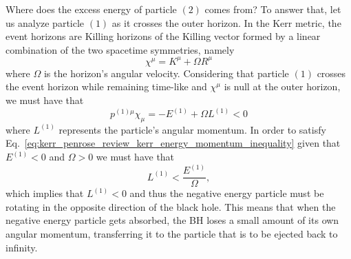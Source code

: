 Where does the excess energy of particle $(2)$ comes from? To answer that, let us analyze particle $(1)$ as it crosses the outer horizon. In the Kerr metric, the event horizons are Killing horizons of the Killing vector formed by a linear combination of the two spacetime symmetries, namely
%
\begin{equation}
  \chi^\mu = K^\mu + \Omega R^\mu
  \label{eq:kerr_penrose_review_kerr_killing_horizon}
\end{equation}
%
where $\Omega$ is the horizon's angular velocity. Considering that particle $(1)$ crosses the event horizon while remaining time-like and $\chi^\mu$ is null at the outer horizon, we must have that
%
\begin{equation}
  p^{(1)\mu}\chi_\mu = -E^{(1)} + \Omega L^{(1)} < 0
  \label{eq:kerr_penrose_review_kerr_energy_momentum_inequality}
\end{equation}
%
where $L^{(1)}$ represents the particle's angular momentum. In order to satisfy Eq.~\eqref{eq:kerr_penrose_review_kerr_energy_momentum_inequality} given that $E^{(1)} < 0$ and $\Omega > 0$ we must have that
%
\begin{equation}
  L^{(1)} < \frac{E^{(1)}}{\Omega},
  \label{eq:kerr_penrose_review_kerr_energy_momentum_inequality_L}
\end{equation}
%
which implies that $L^{(1)} < 0$ and thus the negative energy particle must be rotating in the opposite direction of the black hole. This means that when the negative energy particle gets absorbed, the \ac{BH} loses a small amount of its own angular momentum, transferring it to the particle that is to be ejected back to infinity.

